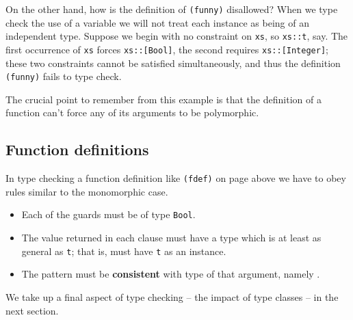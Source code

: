 On the other hand, how is the definition of \texttt{(funny)} disallowed? When we
type check the use of a variable we will not treat each instance as
being of an independent type. Suppose we begin with no constraint on \texttt{xs},
so \texttt{xs::t}, say. The first occurrence of \texttt{xs} forces
\texttt{xs::[Bool]}, the second requires \texttt{xs::[Integer]}; these
two constraints cannot be satisfied simultaneously, and thus the
definition \texttt{(funny)} fails to type check.

The crucial point to remember from this example is that the
definition of a function can't force any of
its arguments to be polymorphic. 

\subsection*{Function definitions}

In type checking a function definition like \texttt{(fdef)} on page \pageref{fdef} above we have
to obey rules similar to the monomorphic case.
\begin{itemize}
\item Each of the guards  must be of type \texttt{Bool}.
\item The value  returned in each clause must have a type  
which is at least as general as \texttt{t}; that is,  must have
\texttt{t} as an instance.
\item The pattern  must be \textbf{consistent} with type
of that argument, namely . 
\end{itemize}
We take up a final aspect of type checking -- the impact of type classes
-- in the next section.

